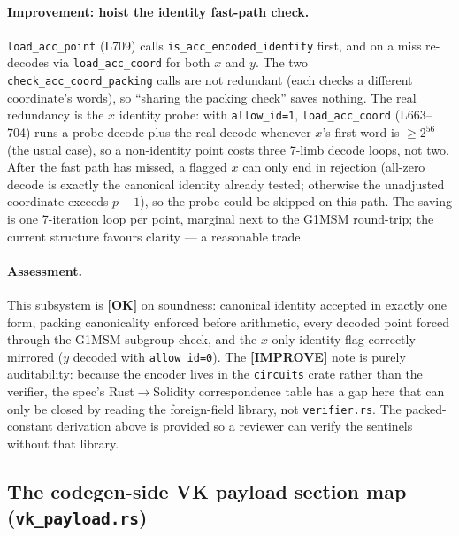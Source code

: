 \paragraph{Improvement: hoist the identity fast-path check.}
\texttt{load\_acc\_point} (L709) calls
\texttt{is\_\allowbreak{}acc\_\allowbreak{}encoded\_\allowbreak{}identity} first, and on a miss re-decodes
via \texttt{load\_acc\_coord} for both $x$ and $y$.
 The two \texttt{check\_\allowbreak{}acc\_\allowbreak{}coord\_\allowbreak{}packing}
calls are not redundant (each checks a different coordinate's
words), so ``sharing the packing check'' saves nothing. The real
redundancy is the $x$ identity probe: with
\texttt{allow\_id=1}, \texttt{load\_acc\_coord} (L663--704) runs a
probe decode plus the real decode whenever $x$'s first word is
$\ge 2^{56}$ (the usual case), so a non-identity point costs three
7-limb decode loops, not two. After the fast path has missed, a
flagged $x$ can only end in rejection (all-zero decode is exactly
the canonical identity already tested; otherwise the unadjusted
coordinate exceeds $p-1$), so the probe could be skipped on this
path.  The saving is one 7-iteration loop per point,
marginal next to the G1MSM round-trip; the current structure
favours clarity --- a reasonable trade.

\paragraph{Assessment.} This subsystem is
\textcolor{tracegreen}{\textbf{[OK]}} on soundness: canonical
identity accepted in exactly one form, packing canonicality
enforced before arithmetic, every decoded point forced through
the G1MSM subgroup check, and the $x$-only identity flag
correctly mirrored ($y$ decoded with \texttt{allow\_id=0}). The
\textcolor{codegenblue}{\textbf{[IMPROVE]}} note is purely
auditability: because the encoder lives in the \texttt{circuits}
crate rather than the verifier, the spec's Rust$\to$Solidity
correspondence table has a gap here that can only be closed by
reading the foreign-field library, not \texttt{verifier.rs}. The packed-constant derivation above is provided so a
reviewer can verify the sentinels without that library.

\subsection{The codegen-side VK payload section map (\texttt{vk\_payload.rs})}
\label{sec:pr-vk-payload-map}

